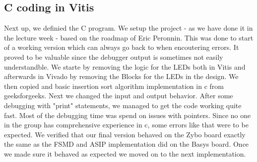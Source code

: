 \documentclass[conference]{IEEEtran}
\begin{document}
\subsection{C coding in Vitis}
Next up, we definied the C program. We setup the project - as we have done it in the lecture week - based on the roadmap of Eric Peronnin. This was done to start of a working version which can always go back to when encoutering errors. It proved to be valuable since the debugger output is sometimes not easily understandble. We starte by removing the logic for the LEDs both in Vitis and afterwards in Vivado by removing the Blocks for the LEDs in the design. We then copied and basic insertion sort algorithm implementation in c from geeksforgeeks\cite{g4g}. Next we changed the input and output behavior. After some debugging with "print" statements, we managed to get the code working quite fast. Most of the debugging time was spend on issues with pointers. Since no one in the group has comprehensive experience in c, some errors like that were to be expected. We verified that our final version behaved on the Zybo board exactly the same as the FSMD and ASIP implementation did on the Basys board. Once we made sure it behaved as expected we moved on to the next implementation.
\end{document}
